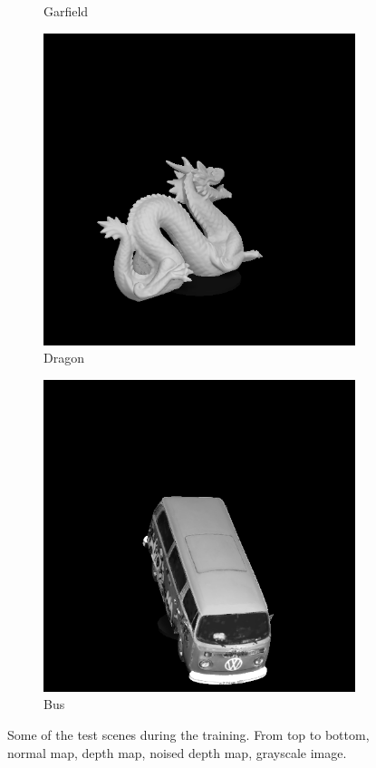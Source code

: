 \documentclass[border=15pt, multi, tikz]{article}
\begin{document}
\begin{figure}[H]
\begin{subfigure}[b]{0.18\linewidth}
		\caption{Garfield}
	\end{subfigure}
	\begin{subfigure}[b]{0.18\linewidth}
		\includegraphics[width=\linewidth]{./Figures/test_scenes/05113.image0.png}
		\caption{Dragon}
	\end{subfigure}
	\begin{subfigure}[b]{0.18\linewidth}
		\includegraphics[width=\linewidth]{./Figures/test_scenes/05126.image0.png}
		\caption{Bus}
	\end{subfigure}	
	\caption{Some of the test scenes during the training. From top to bottom, normal map, depth map, noised depth map, grayscale image.}
	\label{fig:test-scene}
\end{figure}
\end{document}

